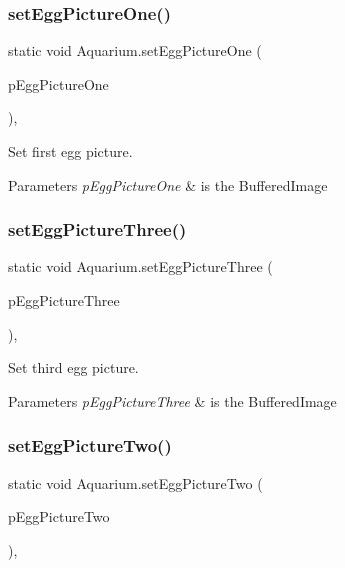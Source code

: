 \subsubsection{\texorpdfstring{set\+Egg\+Picture\+One()}{setEggPictureOne()}}
{\footnotesize\ttfamily static void Aquarium.\+set\+Egg\+Picture\+One (\begin{DoxyParamCaption}\item[{final Buffered\+Image}]{p\+Egg\+Picture\+One }\end{DoxyParamCaption})\hspace{0.3cm}{\ttfamily [inline]}, {\ttfamily [static]}}

Set first egg picture.


\begin{DoxyParams}{Parameters}
{\em p\+Egg\+Picture\+One} & is the Buffered\+Image \\
\hline
\end{DoxyParams}
\mbox{\label{class_aquarium_a7f7c1d667dacf3e52f592ff20a939be0}} 
\subsubsection{\texorpdfstring{set\+Egg\+Picture\+Three()}{setEggPictureThree()}}
{\footnotesize\ttfamily static void Aquarium.\+set\+Egg\+Picture\+Three (\begin{DoxyParamCaption}\item[{final Buffered\+Image}]{p\+Egg\+Picture\+Three }\end{DoxyParamCaption})\hspace{0.3cm}{\ttfamily [inline]}, {\ttfamily [static]}}

Set third egg picture.


\begin{DoxyParams}{Parameters}
{\em p\+Egg\+Picture\+Three} & is the Buffered\+Image \\
\hline
\end{DoxyParams}
\mbox{\label{class_aquarium_a7ff613dbc0b8c2ffdd7e0ce1b96a5d5f}} 
\subsubsection{\texorpdfstring{set\+Egg\+Picture\+Two()}{setEggPictureTwo()}}
{\footnotesize\ttfamily static void Aquarium.\+set\+Egg\+Picture\+Two (\begin{DoxyParamCaption}\item[{final Buffered\+Image}]{p\+Egg\+Picture\+Two }\end{DoxyParamCaption})\hspace{0.3cm}{\ttfamily [inline]}, {\ttfamily [static]}}

